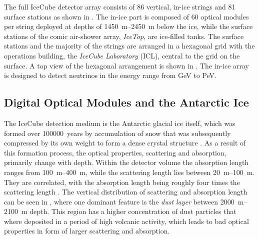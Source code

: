The full IceCube detector array consists of 86 vertical, in-ice strings and 81 surface stations as shown in . The in-ice part is composed of 60 optical modules per string deployed at depths of \SIrange[range-phrase=-]{1450}{2450}{\meter} below the ice, while the surface stations of the comic air-shower array, \textit{IceTop}, are ice-filled tanks. The surface stations and the majority of the strings are arranged in a hexagonal grid with the operations building, the \textit{IceCube Laboratory} (ICL), central to the grid on the surface. A top view of the hexagonal arrangement is shown in . The in-ice array is designed to detect neutrinos in the energy range from \si{\giga\electronvolt} to \si{\peta\electronvolt}.


\subsection{Digital Optical Modules and the Antarctic Ice} 

The IceCube detection medium is the Antarctic glacial ice itself, which was formed over \SI{100000}{years} by accumulation of snow that was subsequently compressed by its own weight to form a dense crystal structure . As a result of this formation process, the optical properties, scattering and absorption, primarily change with depth. Within the detector volume the absorption length ranges from \SIrange[range-phrase=-]{100}{400}{\meter}, while the scattering length lies between \SIrange[range-phrase={~and~}]{20}{100}{\meter}. They are correlated, with the absorption length being roughly four times the scattering length . The vertical distribution of scattering and absorption length can be seen in , where one dominant feature is the \textit{dust layer} between \SIrange[range-phrase={~and~}]{2000}{2100}{\meter} depth. This region has a higher concentration of dust particles that where deposited in a period of high volcanic activity, which leads to bad optical properties in form of larger scattering and absorption.

